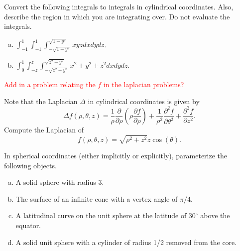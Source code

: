 \documentclass[12pt]{article} %
\begin{document}
\vspace*{.5cm}

\begin{problem}
    Convert the following integrals to integrals in cylindrical coordinates. Also, describe the region in which you are integrating over. Do not evaluate the integrals.
    \begin{enumerate}[(a)]
        \item $\displaystyle{\int_{-1}^{1} \int_{-1}^{1} \int_{-\sqrt{1-y^2}}^{\sqrt{1-y^2}} xyz dxdydz}$.
        \item $\displaystyle{\int_0^1 \int_{-z}^z \int_{-\sqrt{z^2-y^2}}^{\sqrt{z^2-y^2}} x^2+y^2+z^2 dxdydz}$.
    \end{enumerate}
\end{problem}

\vspace*{.5cm}

\textcolor{red}{Add in a problem relating the $f$ in the laplacian problems?}
\begin{problem}
    Note that the Laplacian $\Delta$ in cylindrical coordinates is given by
    \[
        \Delta f(\rho,\theta,z) = \frac{1}{\rho} \frac{\partial}{\partial \rho} \left(\rho \frac{\partial f}{\partial \rho}\right)+\frac{1}{\rho^2}\frac{\partial^2 f}{\partial \theta^2} + \frac{\partial^2 f}{\partial z^2}.
    \]
    Compute the Laplacian of
    \[
        f(\rho,\theta,z) = \sqrt{\rho^2+z^2} z \cos(\theta).
    \]
\end{problem}

\begin{problem}
	In spherical coordinates (either implicitly or explicitly), parameterize the following objects.
	\begin{enumerate}[(a)]
		\item A solid sphere with radius 3.
		\item The surface of an infinite cone with a vertex angle of $\pi/4$.
		\item A latitudinal curve on the unit sphere at the latitude of 30$^\circ$ above the equator.
		\item A solid unit sphere with a cylinder of radius 1/2 removed from the core.
	\end{enumerate}
\end{problem}

\vspace*{.5cm}
\end{document}
